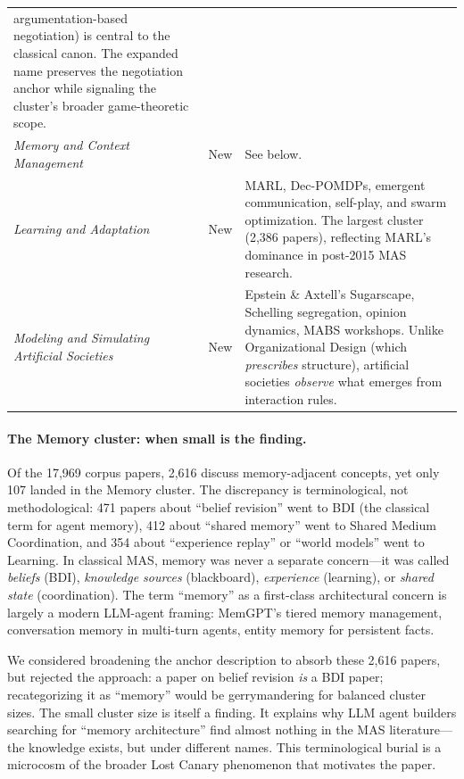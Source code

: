 \documentclass{article}
\begin{document}
\begin{table}[t]
\begin{tabular}{@{} p{4.5cm} l p{8.5cm} @{}}
    argumentation-based negotiation) is central to the classical canon.
    The expanded name preserves the negotiation anchor while signaling
    the cluster's broader game-theoretic scope. \\[4pt]
\emph{Memory and Context Management}
  & New & See below. \\[4pt]
\emph{Learning and Adaptation}
  & New & MARL, Dec-POMDPs, emergent communication, self-play, and
    swarm optimization. The largest cluster (2,386 papers), reflecting
    MARL's dominance in post-2015 MAS research. \\[4pt]
\emph{Modeling and Simulating Artificial Societies}
  & New & Epstein \& Axtell's Sugarscape, Schelling segregation,
    opinion dynamics, MABS workshops. Unlike Organizational Design
    (which \emph{prescribes} structure), artificial societies
    \emph{observe} what emerges from interaction rules. \\
\bottomrule
\end{tabular}
\end{table}

\paragraph{The Memory cluster: when small is the finding.}
Of the 17,969 corpus papers, 2,616 discuss memory-adjacent concepts, yet only 107
landed in the Memory cluster. The discrepancy is terminological, not methodological:
471 papers about ``belief revision'' went to BDI (the classical term for agent memory),
412 about ``shared memory'' went to Shared Medium Coordination, and 354 about
``experience replay'' or ``world models'' went to Learning. In classical MAS, memory
was never a separate concern---it was called \emph{beliefs} (BDI), \emph{knowledge
sources} (blackboard), \emph{experience} (learning), or \emph{shared state}
(coordination). The term ``memory'' as a first-class architectural concern is largely
a modern LLM-agent framing: MemGPT's tiered memory management, conversation memory
in multi-turn agents, entity memory for persistent facts.

We considered broadening the anchor description to absorb these 2,616 papers, but
rejected the approach: a paper on belief revision \emph{is} a BDI paper; recategorizing
it as ``memory'' would be gerrymandering for balanced cluster sizes. The small cluster
size is itself a finding. It explains why LLM agent builders searching for ``memory
architecture'' find almost nothing in the MAS literature---the knowledge exists, but
under different names. This terminological burial is a microcosm of the broader Lost
Canary phenomenon that motivates the paper.
\end{document}
